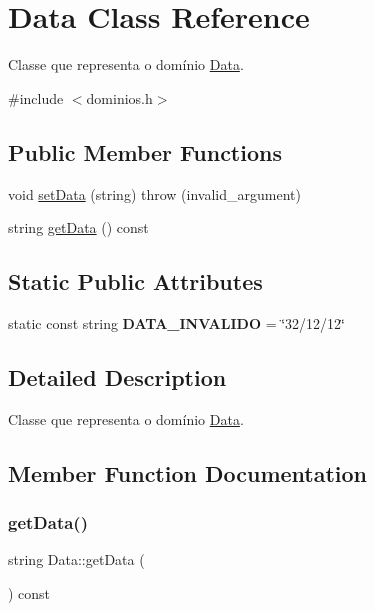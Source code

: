 \hypertarget{classData}{}\section{Data Class Reference}
\label{classData}


Classe que representa o domínio \hyperlink{classData}{Data}.  




{\ttfamily \#include $<$dominios.\+h$>$}

\subsection*{Public Member Functions}
\begin{DoxyCompactItemize}
\item 
void \hyperlink{classData_a75a50f88bc966f20826a3959717a5acc}{set\+Data} (string)  throw (invalid\+\_\+argument)
\item 
string \hyperlink{classData_a13f25eafdc138d743e99eb4086d765a2}{get\+Data} () const
\end{DoxyCompactItemize}
\subsection*{Static Public Attributes}
\begin{DoxyCompactItemize}
\item 
\mbox{\label{classData_a94f69539f4927ab72d2488b2c1ae0fb9}} 
static const string {\bfseries D\+A\+T\+A\+\_\+\+I\+N\+V\+A\+L\+I\+DO} = \char`\"{}32/12/12\char`\"{}
\end{DoxyCompactItemize}


\subsection{Detailed Description}
Classe que representa o domínio \hyperlink{classData}{Data}. 

\subsection{Member Function Documentation}
\mbox{\label{classData_a13f25eafdc138d743e99eb4086d765a2}} 
\subsubsection{\texorpdfstring{get\+Data()}{getData()}}
{\footnotesize\ttfamily string Data\+::get\+Data (\begin{DoxyParamCaption}{ }\end{DoxyParamCaption}) const\hspace{0.3cm}{\ttfamily [inline]}}


